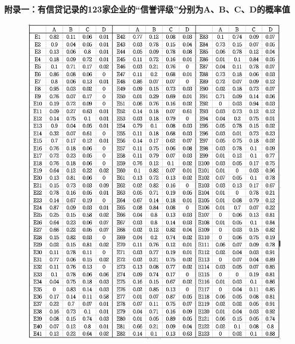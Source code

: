 \documentclass[bwprint]{cumcm}
\begin{document}
\begin{appendices}
 \noindent \textbf{附录一：有信贷记录的123家企业的“信誉评级”分别为A、B、C、D的概率值}
 \begin{figure}[h]%
	\centering  %
	\includegraphics[width=1\linewidth]{figures/figure5.jpg}  %
	\label{fig:mcmthesis-logo}   %
\end{figure}




\end{appendices}
\end{document}
